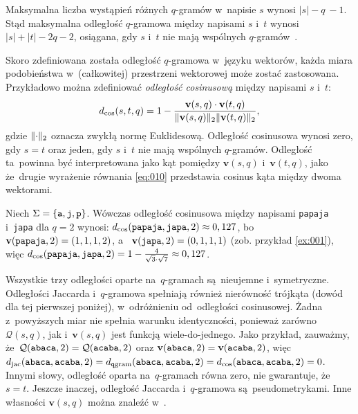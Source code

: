 \documentclass{praca1}
\DeclarePairedDelimiter{\norm}{\lVert}{\rVert}
\begin{document}

Maksymalna liczba wystąpień różnych $q$-gramów w~napisie $s$ wynosi $|s| - q~- 1$. Stąd maksymalna odległość $q$-gramowa między napisami $s$ i~$t$ wynosi $|s| + |t| - 2q - 2$, osiągana, gdy $s$ i~$t$ nie mają wspólnych $q$-gramów~\cite{Loo2014:stringdist}.

Skoro zdefiniowana została odległość $q$-gramowa w~języku wektorów, każda miara podobieństwa w~(całkowitej) przestrzeni wektorowej może zostać zastosowana. Przykładowo można zdefiniować \emph{odległość cosinusową} między napisami $s$ i~$t$:
\begin{equation}
\label{eq:010}
d_{\mathrm{cos}}(s,t,q) = 1 - \frac{ \mathbf{v}(s,q) \cdot \mathbf{v}(t,q) }{ \norm{\mathbf{v}(s,q)}_2  \norm{\mathbf{v}(t,q)}_2 },
\end{equation}
gdzie $\norm{\cdot}_2$ oznacza zwykłą normę Euklidesową. Odległość cosinusowa wynosi zero, gdy $s=t$ oraz jeden, gdy $s$ i~$t$ nie mają wspólnych $q$-gramów. Odległość ta~powinna być interpretowana jako kąt pomiędzy $\mathbf{v}(s,q)$ i~$\mathbf{v}(t,q)$, jako że~drugie wyrażenie równania \eqref{eq:010} przedstawia cosinus kąta między dwoma wektorami.

\begin{example}
Niech $\Sigma = \{\verb|a|, \verb|j|, \verb|p|\}$. Wówczas odległość cosinusowa między napisami \verb|papaja| i~\verb|japa| dla $q = 2$ wynosi: $d_{\mathrm{cos}}(\verb|papaja|, \verb|japa|, 2) \approx 0,127$, bo~$\mathbf{v}( \verb|papaja|,2) = (1, 1, 1, 2)$, a~ $\mathbf{v}( \verb|japa|,2) = (0, 1, 1, 1)$ (zob. przykład \ref{ex:001}), więc $d_{\mathrm{cos}}(\verb|papaja|, \verb|japa|, 2) = 1 - \frac{4}{\sqrt{3}\cdot\sqrt{7}} \approx 0,127$.
\end{example}

Wszystkie trzy odległości oparte na~$q$-gramach są~nieujemne i~symetryczne. Odległości Jaccarda i~$q$-gramowa spełniają również nierówność trójkąta (dowód dla tej pierwszej poniżej), w~odróżnieniu od~odległości cosinusowej. Żadna z~powyższych miar nie spełnia warunku identyczności, ponieważ zarówno $\mathcal{Q}(s,q)$, jak i~$\mathbf{v}(s,q)$ jest funkcją wiele-do-jednego. Jako przykład, zauważmy, że~$\mathcal{Q}(\verb|abaca|,2) = \mathcal{Q}(\verb|acaba|,2)$ oraz $\mathbf{v}(\verb|abaca|,2) = \mathbf{v}(\verb|acaba|,2)$, więc $d_{\mathrm{jac}}(\verb|abaca|, \verb|acaba|, 2) = d_{\mathtt{q}\mathrm{gram}}(\verb|abaca|, \verb|acaba|, 2) = d_{\mathrm{cos}}(\verb|abaca|, \verb|acaba|, 2) = 0$. Innymi słowy, odległość oparta na~$q$-gramach równa zero, nie gwarantuje, że~$s = t$. Jeszcze inaczej, odległość Jaccarda i~$q$-gramowa są~pseudometrykami. Inne własności $\mathbf{v}(s,q)$ można znaleźć w~\cite{Ukkonen1992:approxqgrams}.
\end{document}
